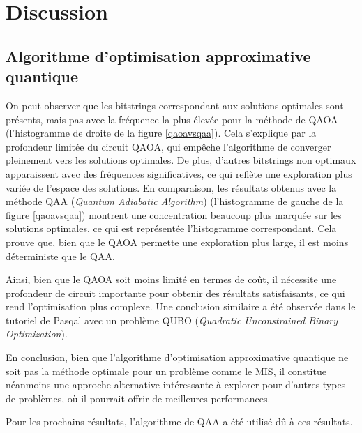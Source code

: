 \documentclass[11pt]{article}
\begin{document}
\section{Discussion}

\subsection{Algorithme d'optimisation approximative quantique}

 On peut observer que les bitstrings correspondant aux solutions optimales sont présents, mais pas avec la fréquence la plus élevée pour la méthode de QAOA (l'histogramme de droite de la figure \ref{qaoavsqaa}). Cela s'explique par la profondeur limitée du circuit QAOA, qui empêche l'algorithme de converger pleinement vers les solutions optimales. De plus, d'autres bitstrings non optimaux apparaissent avec des fréquences significatives, ce qui reflète une exploration plus variée de l'espace des solutions.
En comparaison, les résultats obtenus avec la méthode QAA (\textit{Quantum Adiabatic Algorithm}) (l'histogramme de gauche de la figure \ref{qaoavsqaa}) montrent une concentration beaucoup plus marquée sur les solutions optimales, ce qui est représentée l'histogramme correspondant. Cela prouve que, bien que le QAOA permette une exploration plus large, il est moins déterministe que le QAA.


Ainsi, bien que le QAOA soit moins limité en termes de coût, il nécessite une profondeur de circuit importante pour obtenir des résultats satisfaisants, ce qui rend l'optimisation plus complexe. Une conclusion similaire a été observée dans le tutoriel de Pasqal \cite{noauthor_qaoa_nodate} avec un problème QUBO (\textit{Quadratic Unconstrained Binary Optimization}).

En conclusion, bien que l'algorithme d'optimisation approximative quantique ne soit pas la méthode optimale pour un problème comme le MIS, il constitue néanmoins une approche alternative intéressante à explorer pour d'autres types de problèmes, où il pourrait offrir de meilleures performances.

Pour les prochains résultats, l'algorithme de QAA a été utilisé dû à ces résultats.
\end{document}
